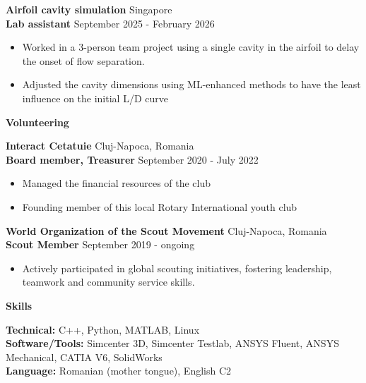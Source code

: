 \documentclass[11pt]{article}
\newcommand{\cvsection}[1]{%
  \vspace{12pt}%
  \centerline{\textbf{#1}}%
  \vspace{8pt}%
}
\newcommand{\cvrole}[4]{%
  \textbf{#1} \hfill #2 \\
  \textbf{#3} \hfill #4\par
}
\newcommand{\cvgap}{\vspace{0.7em}}
\begin{document}
\cvrole{Airfoil cavity simulation}{Singapore}{Lab assistant}{September 2025 - February 2026}
\begin{itemize}
  \item Worked in a 3-person team project using a single cavity in the airfoil to delay the onset of flow separation.
  \item Adjusted the cavity dimensions using ML-enhanced methods to have the least influence on the initial L/D curve
\end{itemize}

\cvsection{Volunteering}

\cvrole{Interact Cetatuie}{Cluj-Napoca, Romania}{Board member, Treasurer}{September 2020 - July 2022}
\begin{itemize}
  \item Managed the financial resources of the club
  \item Founding member of this local Rotary International youth club
\end{itemize}
\cvgap

\cvrole{World Organization of the Scout Movement}{Cluj-Napoca, Romania}{Scout Member}{September 2019 - ongoing}
\begin{itemize}
  \item Actively participated in global scouting initiatives, fostering leadership, teamwork and community service skills.
\end{itemize}

\vspace{-8pt}
\cvsection{Skills}

\textbf{Technical:} C++, Python, MATLAB, Linux \\
\textbf{Software/Tools:} Simcenter 3D, Simcenter Testlab, ANSYS Fluent, ANSYS Mechanical, CATIA V6, SolidWorks \\
\textbf{Language:} Romanian (mother tongue), English C2
\end{document}
